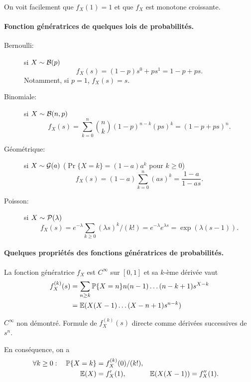 \remark
On voit facilement que $f_X(1) = 1$ et que $f_X$ est monotone croissante.

\paragraph*{Fonction génératrices de quelques lois de probabilités.}
\begin{description}
  \item[Bernoulli:] si $X \sim \mathcal{B}(p)$ 
  $$
  f_X(s) = (1-p) s^0 + p s^1 = 1 - p + p s.
  $$
  Notamment, si $p = 1$, $f_X(s) = s$.
  \item[Binomiale:] si $X \sim \mathcal{B}(n, p)$
  $$
  f_X(s) = \sum_{k=0}^n {{n}\choose{k}} (1-p)^{n-k} (ps)^k = (1 - p + ps)^n.
  $$
  \item[Géométrique:] si $X \sim \mathcal{G}(a)$ ($\Pr\{X = k\} = (1-a) a^k$ pour $k \geq 0$)
  $$
  f_X(s) = (1-a) \sum_{k=0}^n (as)^k = \frac{1-a}{1 - as}.
  $$
  \item[Poisson:] si $X \sim \mathcal{P}(\lambda)$
  $$
  f_X(s) = e^{-\lambda} \sum_{k\geq0} (\lambda s)^k / (k!) = e^{-\lambda} e^{\lambda s} = \exp(\lambda(s-1)).
  $$
\end{description}

\paragraph*{Quelques propriétés des fonctions génératrices de probabilités.}

\begin{proposition}
  La fonction génératrice $f_X$ est $C^\infty$ sur $[0, 1]$ et sa $k$-ème dérivée vaut
  \begin{align*}
    f_X^{(k)}(s) 
    & = \sum_{n \geq k} \operatorname{\mathbb{P}}\{X = n\} n(n-1)  \dots (n-k+1) s^{X-k} \\
    & = \operatorname{\mathbb{E}}(X (X-1) \dots (X-n+1) s^{n-k})
  \end{align*}
\end{proposition}

\proof
  $C^\infty$ non démontré. Formule de $f_X^{(k)}(s)$ directe comme dérivées successives de $s^n$.
\eproof

\begin{corollary}
  En conséquence, on a
  \begin{align*}
    \forall k \geq 0: \quad \operatorname{\mathbb{P}}\{X = k\} & = f_X^{(k)}(0) / (k!), \\
    \operatorname{\mathbb{E}}(X) & = f'_X(1), &
    \operatorname{\mathbb{E}}(X(X-1)) & = f''_X(1).
  \end{align*}
\end{corollary}

